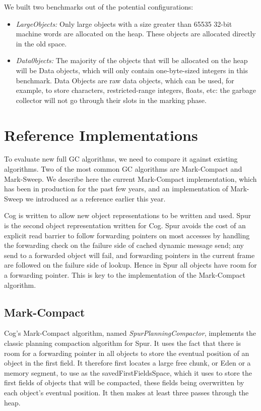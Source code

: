 \documentclass[10pt, sigplan]{acmart}
\begin{document}
We built two benchmarks out of the potential configurations:
\begin{itemize}
\item \emph{LargeObjects:} Only large objects with a size greater than 65535 32-bit machine words are allocated on the heap. These objects are allocated directly in the old space.
\item \emph{Data0bjects:} The majority of the objects that will be allocated on the heap will be Data objects, which will only contain one-byte-sized integers in this benchmark. Data Objects are raw data objects, which can be used, for example, to store characters, restricted-range integers, floats, etc: the garbage collector will not go through their slots in the marking phase.
\end{itemize}

\section{Reference Implementations} \label{sec:ref}

To evaluate new full GC algorithms, we need to compare it against existing algorithms. Two of the most common GC algorithms are Mark-Compact and Mark-Sweep. We describe here the current Mark-Compact implementation, which has been in production for the past few years, and an implementation of Mark-Sweep we introduced as a reference earlier this year.

Cog is written to allow new object representations to be written and used.  Spur \cite{SpurMirandaBera} is the second object representation written for Cog.  Spur avoids the cost of an explicit read barrier to follow forwarding pointers on most accesses by handling the forwarding check on the failure side of cached dynamic message send; any send to a forwarded object will fail, and forwarding pointers in the current frame are followed on the failure side of lookup.  Hence in Spur all objects have room for a forwarding pointer.  This is key to the implementation of the Mark-Compact algorithm. 

\subsection{Mark-Compact} \label{sec:refmc}


Cog's Mark-Compact algorithm, named \emph{SpurPlanningCompactor}, implements the classic planning compaction algorithm for Spur.  It uses the fact that there is room for a forwarding pointer in all objects to store the eventual position of an object in the first field. It therefore first locates a large free chunk, or Eden or a memory segment, to use as the savedFirstFieldsSpace, which it uses to store the first fields of objects that will be compacted, these fields being overwritten by each object's eventual position. It then makes at least three passes through the heap.
\end{document}
